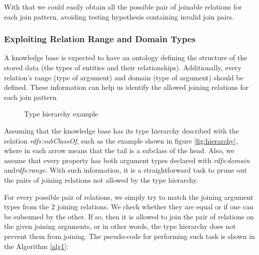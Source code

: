 With that we could easily obtain all the possible pair of joinable relations for each join pattern, avoiding testing
hypothesis containing invalid join pairs.

\subsubsection{Exploiting Relation Range and Domain Types}

A knowledge base is expected to have an ontology defining the structure of the stored data (the types of entities and
their relationships). Additionally, every relation's range (type of  argument) and domain (type of 
argument) should be defined. These information can help us identify the allowed joining relations for each join pattern.

\begin{figure}[h!]
  \label{fig:hierarchy}
  \caption{Type hierarchy example}
  \centering

\label{fig:typeHierarchy}
\end{figure}

Assuming that the knowledge base has its type hierarchy described with the relation \emph{rdfs:subClassOf}, such as the
example shown in figure \ref{fig:hierarchy}, where in each arrow means that the tail is a subclass of the head. Also,
we assume that every property has both argument types declared with \emph{rdfs:domain} and\emph{rdfs:range}. With such
information, it is a straightforward task to prune out the pairs of joining relations not allowed by the type
hierarchy.    

For every possible pair of relations, we simply try to match the joining argument types from the 2 joining relations. We
check whether they are equal or if one can be subsumed by the other. If so, then it is allowed to join the pair of
relations
on the given joining arguments, or in other words, the type hierarchy does not prevent them from joining. The
pseudo-code
for performing such task is
shown in the Algorithm \ref{alg1}:


